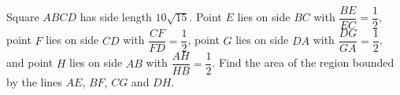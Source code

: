 Square $ABCD$ has side length $10\sqrt{15}$. Point $E$ lies on side $BC$ with $\dfrac{BE}{EC}=\dfrac12$, point $F$ lies on side $CD$ with $\dfrac{CF}{FD}=\dfrac12$, point $G$ lies on side $DA$ with $\dfrac{DG}{GA}=\dfrac12$, and point $H$ lies on side $AB$ with $\dfrac{AH}{HB}=\dfrac12$. Find the area of the region bounded by the lines $AE$, $BF$, $CG$ and $DH$.
